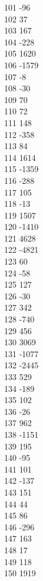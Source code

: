 { 101	-96 \\
 102	37 \\
 103	167 \\
 104	-228 \\
 105	1620 \\
 106	-1579 \\
 107	-8 \\
 108	-30 \\
 109	70 \\
 110	72 \\
 111	148 \\
 112	-358 \\
 113	84 \\
 114	1614 \\
 115	-1359 \\
 116	-288 \\
 117	105 \\
 118	-13 \\
 119	1507 \\
 120	-1410 \\
 121	4628 \\
 122	-4821 \\
 123	60 \\
 124	-58 \\
 125	127 \\
 126	-30 \\
 127	342 \\
 128	-740 \\
 129	456 \\
 130	3069 \\
 131	-1077 \\
 132	-2445 \\
 133	529 \\
 134	-189 \\
 135	102 \\
 136	-26 \\
 137	962 \\
 138	-1151 \\
 139	195 \\
 140	-95 \\
 141	101 \\
 142	-137 \\
 143	151 \\
 144	44 \\
 145	86 \\
 146	-296 \\
 147	163 \\
 148	17 \\
 149	118 \\
 150	1919 \\
}
